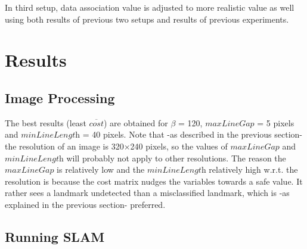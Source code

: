\documentclass{ba-kecs}
\numberwithin{figure}{section}
\numberwithin{equation}{section}
\begin{document}
{In third setup, data association value is adjusted to more realistic value as well using both results of previous two setups and results of previous experiments.


\section{Results}

\subsection{Image Processing}
The best results (least $\overline{\textit{cost}}$) are obtained for $\beta$ = 120,  $\textit{maxLineGap}$ = 5 pixels and $\textit{minLineLength}$ = 40 pixels. Note that -as described in the previous section- the resolution of an image is 320$\times$240 pixels, so the values of $\textit{maxLineGap}$ and $\textit{minLineLength}$ will probably not apply to other resolutions.
The reason the $\textit{maxLineGap}$ is relatively low and the $\textit{minLineLength}$ relatively high w.r.t. the resolution is because the cost matrix nudges the variables towards a safe value. It rather sees a landmark undetected than a misclassified landmark, which is -as explained in the previous section- preferred.

\subsection{Running SLAM}
}
\end{document}

